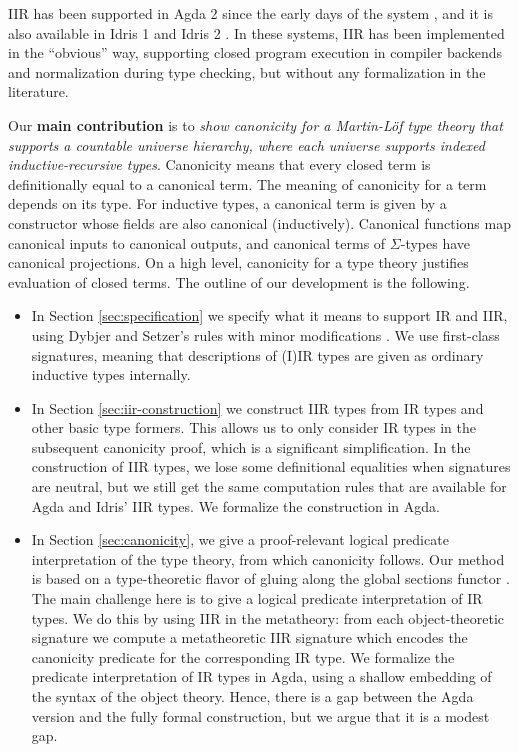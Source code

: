 \documentclass[acmsmall,screen,review]{acmart}
\begin{document}
IIR has been supported in Agda 2 since the early days of the system \cite{DBLP:conf/tphol/BoveDN09},
and it is also available in Idris 1 \cite{DBLP:journals/jfp/Brady13} and Idris 2
\cite{DBLP:conf/ecoop/Brady21}. In these systems, IIR has been implemented in the ``obvious'' way,
supporting closed program execution in compiler backends and normalization during type checking, but
without any formalization in the literature.

Our \textbf{main contribution} is to \emph{show canonicity for a Martin-Löf type theory that
supports a countable universe hierarchy, where each universe supports indexed inductive-recursive
types}. Canonicity means that every closed term is definitionally equal to a canonical term. The
meaning of canonicity for a term depends on its type. For inductive types, a canonical term is given
by a constructor whose fields are also canonical (inductively). Canonical functions map canonical
inputs to canonical outputs, and canonical terms of $\Sigma$-types have canonical projections. On a
high level, canonicity for a type theory justifies evaluation of closed terms. The outline of our
development is the following.

\begin{itemize}
\item In Section \ref{sec:specification} we specify what it means to support IR and IIR, using
  Dybjer and Setzer's rules with minor modifications \cite{DBLP:journals/jlp/DybjerS06,DBLP:journals/apal/DybjerS03}. We use
  first-class signatures, meaning that descriptions of (I)IR types are given as ordinary inductive
  types internally.
\item In Section \ref{sec:iir-construction} we construct IIR types from IR types and other basic
  type formers. This allows us to only consider IR types in the subsequent canonicity proof, which
  is a significant simplification. In the construction of IIR types, we lose some definitional
  equalities when signatures are neutral, but we still get the same computation rules that are
  available for Agda and Idris' IIR types. We formalize the construction in Agda.
\item In Section \ref{sec:canonicity}, we give a proof-relevant logical predicate interpretation of
  the type theory, from which canonicity follows. Our method is based on a type-theoretic flavor of
  gluing along the global sections functor \cite{gluing,coquand2018canonicity}. The main challenge
  here is to give a logical predicate interpretation of IR types. We do this by using IIR in the
  metatheory: from each object-theoretic signature we compute a metatheoretic IIR signature which
  encodes the canonicity predicate for the corresponding IR type.  We formalize the predicate
  interpretation of IR types in Agda, using a shallow embedding of the syntax of the object
  theory. Hence, there is a gap between the Agda version and the fully formal construction, but we
  argue that it is a modest gap.
\end{itemize}
\end{document}
